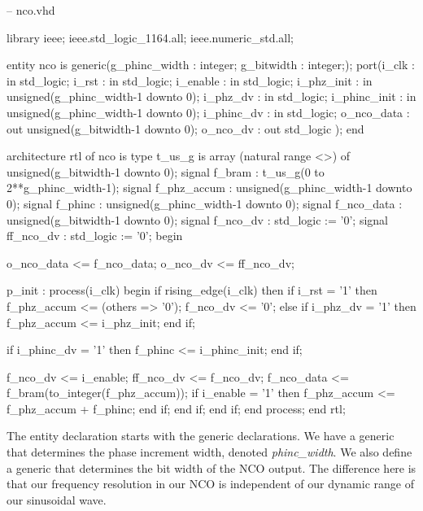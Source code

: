 \begin{VHDLlisting}[tabsize=2]
-- nco.vhd

library ieee;
    ieee.std_logic_1164.all;
    ieee.numeric_std.all;
	
entity nco is
generic(g_phinc_width : integer;
        g_bitwidth    : integer;);
port(i_clk        : in    std_logic;
     i_rst        : in    std_logic;
     i_enable     : in    std_logic;
     i_phz_init   : in    unsigned(g_phinc_width-1 downto 0);
     i_phz_dv     : in    std_logic;
     i_phinc_init : in    unsigned(g_phinc_width-1 downto 0);
     i_phinc_dv   : in    std_logic;
     o_nco_data   :   out unsigned(g_bitwidth-1 downto 0);
     o_nco_dv     :   out std_logic
);
end 

architecture rtl of nco is
    type t_us_g is array (natural range <>) of 
                           unsigned(g_bitwidth-1 downto 0);
    signal f_bram       : t_us_g(0 to 2**g_phinc_width-1);
    signal f_phz_accum  : unsigned(g_phinc_width-1 downto 0);
    signal f_phinc      : unsigned(g_phinc_width-1 downto 0);
    signal f_nco_data   : unsigned(g_bitwidth-1 downto 0);
    signal f_nco_dv     : std_logic := '0';
    signal ff_nco_dv    : std_logic := '0';
begin

    o_nco_data <= f_nco_data;
    o_nco_dv   <= ff_nco_dv;
	
    p_init : process(i_clk)
    begin
        if rising_edge(i_clk) then
            if i_rst = '1' then
                f_phz_accum <= (others => '0');
                f_nco_dv <= '0';
            else
                if i_phz_dv = '1' then
                    f_phz_accum <= i_phz_init;
                end if;
				
                if i_phinc_dv = '1' then
                    f_phinc <= i_phinc_init;
                end if;
				
                f_nco_dv <= i_enable;
                ff_nco_dv <= f_nco_dv;
                f_nco_data <= f_bram(to_integer(f_phz_accum));
                if i_enable = '1' then
                    f_phz_accum <= f_phz_accum + f_phinc;
                end if;				
            end if;
        end if;	
    end process;
end rtl;
\end{VHDLlisting}

The entity declaration starts with the generic declarations. We have a generic that determines the phase increment width, denoted \emph{phinc\_width}. We also define a generic that determines the bit width of the \ac{NCO} output. The difference here is that our frequency resolution in our \ac{NCO} is independent of our dynamic range of our sinusoidal wave. 

